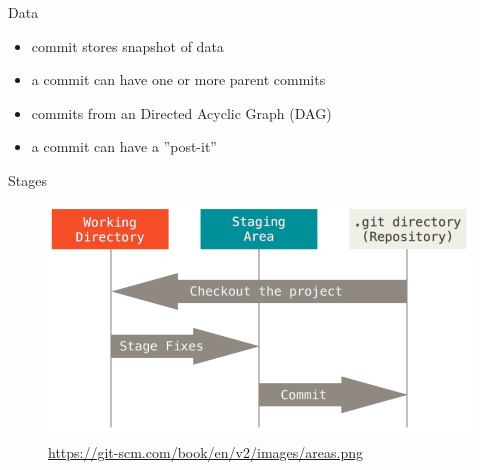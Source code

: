 \begin{frame}{Data}
	\begin{itemize}
		\item commit stores snapshot of data
		\item a commit can have one or more parent commits
		\item commits from an Directed Acyclic Graph (DAG)
		\item a commit can have a ''post-it''
	\end{itemize}
\end{frame}

\begin{frame}{Stages}
	\begin{figure}
		\centering
		\includegraphics[width=\columnwidth]{10-git/areas.png}
		\caption{\url{https://git-scm.com/book/en/v2/images/areas.png}}
	\end{figure}
\end{frame}

